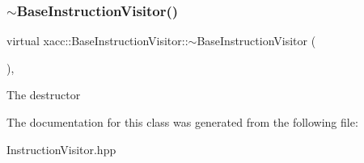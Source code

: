 \subsubsection{\texorpdfstring{$\sim$\+Base\+Instruction\+Visitor()}{~BaseInstructionVisitor()}}
{\footnotesize\ttfamily virtual xacc\+::\+Base\+Instruction\+Visitor\+::$\sim$\+Base\+Instruction\+Visitor (\begin{DoxyParamCaption}{ }\end{DoxyParamCaption})\hspace{0.3cm}{\ttfamily [inline]}, {\ttfamily [virtual]}}

The destructor 

The documentation for this class was generated from the following file\+:\begin{DoxyCompactItemize}
\item 
Instruction\+Visitor.\+hpp\end{DoxyCompactItemize}
